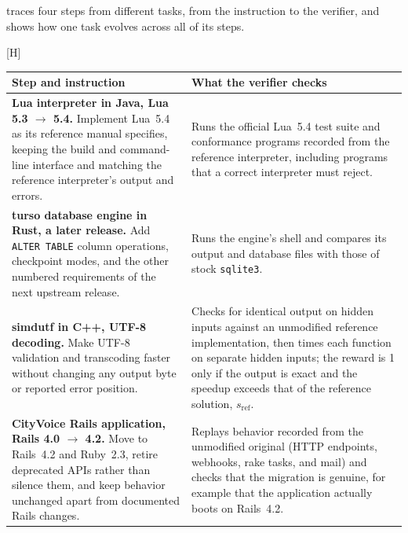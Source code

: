 \documentclass{article}
\makeatletter
\renewenvironment{table}
  {\setlength{\abovecaptionskip}{\@abovecaptionskip}%
   \setlength{\belowcaptionskip}{\@belowcaptionskip}%
   \@float{table}}
  {\end@float}
\makeatother
\begin{document}
 traces four steps from different tasks, from the
instruction to the verifier, and  shows how one task evolves
across all of its steps.

\begin{table}[H]
  \centering
  \footnotesize
  \begin{tabularx}{\linewidth}{@{}>{\raggedright\arraybackslash}X >{\raggedright\arraybackslash}X@{}}
    \toprule
    Step and instruction & What the verifier checks \\
    \midrule
    \textbf{Lua interpreter in Java, Lua 5.3 $\to$ 5.4.} Implement Lua~5.4 as
      its reference manual specifies, keeping the build and command-line
      interface and matching the reference interpreter's output and errors.
    & Runs the official Lua~5.4 test suite and conformance programs recorded
      from the reference interpreter, including programs that a correct
      interpreter must reject. \\
    \addlinespace
    \textbf{turso database engine in Rust, a later release.} Add
      \texttt{ALTER TABLE} column operations, checkpoint modes, and the other
      numbered requirements of the next upstream release.
    & Runs the engine's shell and compares its output and database files with
      those of stock \texttt{sqlite3}. \\
    \addlinespace
    \textbf{simdutf in C++, UTF-8 decoding.} Make UTF-8 validation and
      transcoding faster without changing any output byte or reported error
      position.
    & Checks for identical output on hidden inputs against an unmodified
      reference implementation, then times each function on separate hidden
      inputs; the reward is 1 only if the output is exact and the speedup
      exceeds that of the reference solution, $s_{\mathrm{ref}}$. \\
    \addlinespace
    \textbf{CityVoice Rails application, Rails 4.0 $\to$ 4.2.} Move to
      Rails~4.2 and Ruby~2.3, retire deprecated APIs rather than silence them,
      and keep behavior unchanged apart from documented Rails changes.
    & Replays behavior recorded from the unmodified original (HTTP endpoints,
      webhooks, rake tasks, and mail) and checks that the migration is
      genuine, for example that the application actually boots on Rails~4.2. \\
    \bottomrule
  \end{tabularx}
  \caption{Four example steps, from instruction to verifier.}
  \label{tab:examples}
\end{table}
\end{document}
